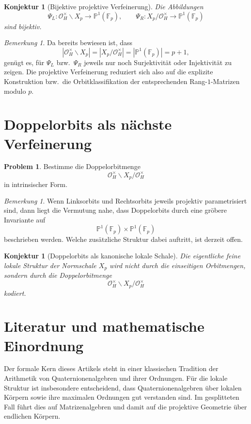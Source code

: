 \documentclass[12pt,a4paper]{article}
\theoremstyle{plain}
\newtheorem{konjektur}[satz]{Konjektur}
\theoremstyle{definition}
\newtheorem{problem}[satz]{Problem}
\theoremstyle{remark}
\newtheorem{bemerkung}[satz]{Bemerkung}
\newcommand{\OH}{\mathcal O_H}
\newcommand{\Fp}{\mathbb F_p}
\newcommand{\PP}{\mathbb P}
\begin{document}
	\begin{konjektur}[Bijektive projektive Verfeinerung]
		Die Abbildungen
		\[
		\Psi_L:\OH^\times\backslash X_p\to\PP^1(\Fp),
		\qquad
		\Psi_R:X_p/\OH^\times\to\PP^1(\Fp)
		\]
		sind bijektiv.
	\end{konjektur}
	
	\begin{bemerkung}
		Da bereits bewiesen ist, dass
		\[
		|\OH^\times\backslash X_p|=|X_p/\OH^\times|=|\PP^1(\Fp)|=p+1,
		\]
		genügt es, für \(\Psi_L\) bzw.\ \(\Psi_R\) jeweils nur noch Surjektivität oder Injektivität zu zeigen. Die projektive Verfeinerung reduziert sich also auf die explizite Konstruktion bzw.\ die Orbitklassifikation der entsprechenden Rang-\(1\)-Matrizen modulo \(p\).
	\end{bemerkung}
	
	\section{Doppelorbits als nächste Verfeinerung}
	
	\begin{problem}
		Bestimme die Doppelorbitmenge
		\[
		\OH^\times\backslash X_p/\OH^\times
		\]
		in intrinsischer Form.
	\end{problem}
	
	\begin{bemerkung}
		Wenn Linksorbits und Rechtsorbits jeweils projektiv parametrisiert sind, dann liegt die Vermutung nahe, dass Doppelorbits durch eine gröbere Invariante auf
		\[
		\PP^1(\Fp)\times \PP^1(\Fp)
		\]
		beschrieben werden. Welche zusätzliche Struktur dabei auftritt, ist derzeit offen.
	\end{bemerkung}
	
	\begin{konjektur}[Doppelorbits als kanonische lokale Schale]
		Die eigentliche feine lokale Struktur der Normschale \(X_p\) wird nicht durch die einseitigen Orbitmengen, sondern durch die Doppelorbitmenge
		\[
		\OH^\times\backslash X_p/\OH^\times
		\]
		kodiert.
	\end{konjektur}
	
	\section{Literatur und mathematische Einordnung}
	
	Der formale Kern dieses Artikels steht in einer klassischen Tradition der Arithmetik von Quaternionenalgebren und ihrer Ordnungen. Für die lokale Struktur ist insbesondere entscheidend, dass Quaternionenalgebren über lokalen Körpern sowie ihre maximalen Ordnungen gut verstanden sind. Im gesplitteten Fall führt dies auf Matrizenalgebren und damit auf die projektive Geometrie über endlichen Körpern.
	
\end{document}
